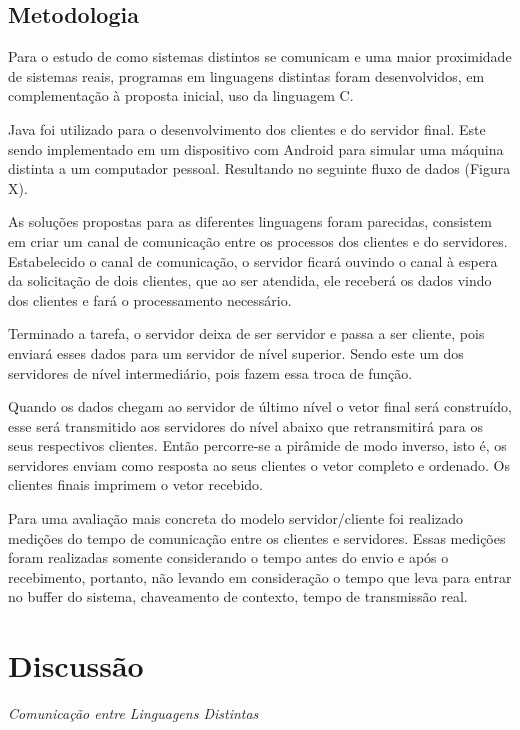 \documentclass[11pt,twoside]{article}
\begin{document}
\subsection{Metodologia}
Para o estudo de como sistemas distintos se comunicam e uma maior proximidade de sistemas reais, programas em linguagens distintas foram desenvolvidos, em complementação à proposta inicial, uso da linguagem C.

Java foi utilizado para o desenvolvimento dos clientes e do servidor final. Este sendo implementado em um dispositivo com Android para simular uma máquina distinta a um computador pessoal. Resultando no seguinte fluxo de dados (Figura X).

As soluções propostas para as diferentes linguagens foram parecidas, consistem em criar um canal de comunicação entre os processos dos clientes e do servidores. Estabelecido o canal de comunicação, o servidor ficará ouvindo o canal à espera da solicitação de dois clientes, que ao ser atendida, ele receberá os dados vindo dos clientes e fará o processamento necessário.

Terminado a tarefa, o servidor deixa de ser servidor e passa a ser cliente, pois enviará esses dados para um servidor de nível superior. Sendo este um dos servidores de nível intermediário, pois fazem essa troca de função.

Quando os dados chegam ao servidor de último nível o vetor final será construído, esse será transmitido aos servidores do nível abaixo que retransmitirá para os seus respectivos clientes. Então percorre-se a pirâmide de modo inverso, isto é, os servidores enviam como resposta ao seus clientes o vetor completo e ordenado. Os clientes finais imprimem o vetor recebido.

Para uma avaliação mais concreta do modelo servidor/cliente foi realizado medições do tempo de comunicação entre os clientes e servidores. Essas medições foram realizadas somente considerando o tempo antes do envio e após o recebimento, portanto, não levando em consideração o tempo que leva para entrar no buffer do sistema, chaveamento de contexto, tempo de transmissão real. 


\newpage
\section{Discussão}
\textit{\Large{Comunicação entre Linguagens Distintas}}
\\
\end{document}
